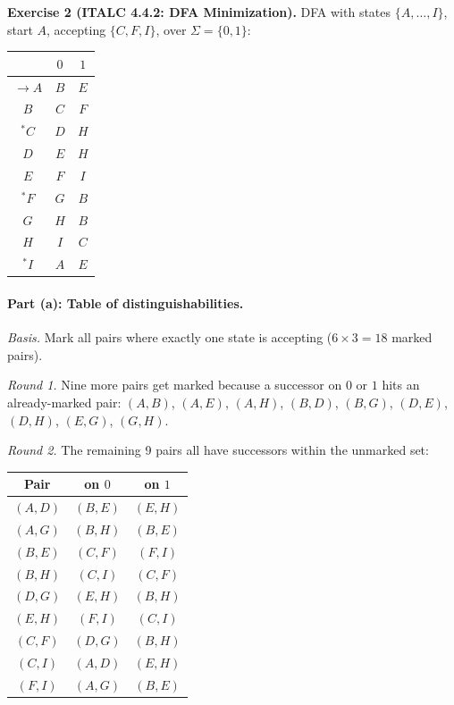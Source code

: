 \documentclass{article}
\theoremstyle{theorem}
\theoremstyle{definition}
\theoremstyle{remark}
\begin{document}
\bigskip

\textbf{Exercise 2 (ITALC 4.4.2: DFA Minimization).}
DFA with states $\{A,\ldots,I\}$, start $A$, accepting $\{C, F, I\}$, over $\Sigma = \{0, 1\}$:

\begin{center}
\begin{tabular}{c|cc}
 & $0$ & $1$ \\ \hline
$\to A$ & $B$ & $E$ \\
$B$ & $C$ & $F$ \\
${}^*C$ & $D$ & $H$ \\
$D$ & $E$ & $H$ \\
$E$ & $F$ & $I$ \\
${}^*F$ & $G$ & $B$ \\
$G$ & $H$ & $B$ \\
$H$ & $I$ & $C$ \\
${}^*I$ & $A$ & $E$ \\
\end{tabular}
\end{center}

\paragraph{Part (a): Table of distinguishabilities.}

\emph{Basis.} Mark all pairs where exactly one state is accepting ($6 \times 3 = 18$ marked pairs).

\emph{Round 1.} Nine more pairs get marked because a successor on $0$ or $1$ hits an already-marked pair: $(A,B)$, $(A,E)$, $(A,H)$, $(B,D)$, $(B,G)$, $(D,E)$, $(D,H)$, $(E,G)$, $(G,H)$.

\emph{Round 2.} The remaining 9 pairs all have successors within the unmarked set:

\begin{center}
\begin{tabular}{c|cc}
Pair & on $0$ & on $1$ \\ \hline
$(A,D)$ & $(B,E)$ & $(E,H)$ \\
$(A,G)$ & $(B,H)$ & $(B,E)$ \\
$(B,E)$ & $(C,F)$ & $(F,I)$ \\
$(B,H)$ & $(C,I)$ & $(C,F)$ \\
$(D,G)$ & $(E,H)$ & $(B,H)$ \\
$(E,H)$ & $(F,I)$ & $(C,I)$ \\
$(C,F)$ & $(D,G)$ & $(B,H)$ \\
$(C,I)$ & $(A,D)$ & $(E,H)$ \\
$(F,I)$ & $(A,G)$ & $(B,E)$ \\
\end{tabular}
\end{center}
\end{document}
